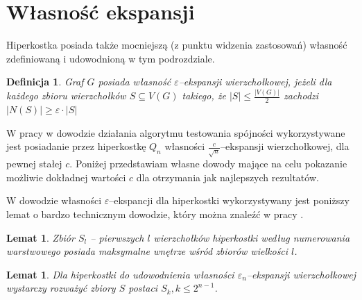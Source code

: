 \documentclass{pracamgr}
\newtheorem{defi}[theorem]{Definicja}
\newtheorem{lemma}[theorem]{Lemat}
\begin{document}
  \section{Własność ekspansji}\label{ekspansja podrozdzial}
   \begin{spacing}{1.3}
    Hiperkostka posiada także mocniejszą (z punktu widzenia zastosowań) własność zdefiniowaną i udowodnioną w tym podrozdziale.
    \begin{defi}\label{epsilon ekspansja wierzcholkowa}
     Graf $G$ posiada własność \emph{$\varepsilon$--ekspansji wierzchołkowej}, jeżeli dla każdego zbioru wierzchołków $S\subseteq V(G)$ takiego,
     że $|S|\le\frac{|V(G)|}{2}$ zachodzi $|N(S)|\ge\varepsilon\cdot|S|$
    \end{defi}
    W pracy \cite{DFGKR} w dowodzie działania algorytmu testowania spójności wykorzystywane jest posiadanie przez hiperkostkę $Q_n$ własności
    $\frac{c}{\sqrt{n}}$--ekspansji wierzchołkowej, dla pewnej stałej $c$. Poniżej przedstawiam własne dowody mające na celu pokazanie możliwie dokładnej wartości
    $c$ dla otrzymania jak najlepszych rezultatów.
    
    W dowodzie własności $\varepsilon$--ekspancji dla hiperkostki wykorzystywany jest poniższy lemat o bardzo technicznym dowodzie, który można znaleźć w pracy \cite{HAR}.
    \begin{lemma}\label{HAR1}
     Zbiór $S_l$ -- pierwszych $l$ wierzchołków hiperkostki według numerowania warstwowego posiada maksymalne wnętrze wśród zbiorów wielkości $l$.  
    \end{lemma}
    \begin{lemma}\label{S->S_k}
     Dla hiperkostki do udowodnienia własności $\varepsilon_n$--ekspansji wierzchołkowej wystarczy rozważyć zbiory $S$ postaci $S_k,k\le 2^{n-1}$.
    \end{lemma}
   \end{spacing}
   \vspace*{-20pt}
\end{document}
